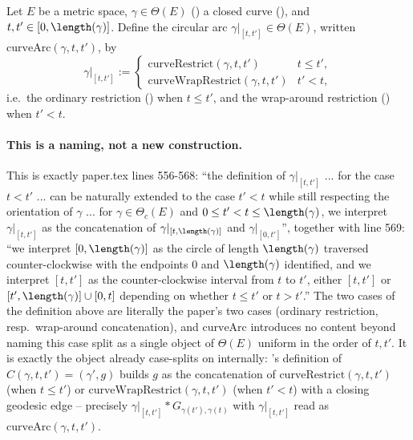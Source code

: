 \begin{definition}
  Let $E$ be a metric space, $\gamma \in \Theta(E)$ () a closed curve
  (), and $t,t' \in [0,\length(\gamma)]$. Define the circular arc
  $\gamma|_{[t,t']} \in \Theta(E)$, written $\mathrm{curveArc}(\gamma,t,t')$, by
  \[
    \gamma|_{[t,t']} :=
    \begin{cases}
      \mathrm{curveRestrict}(\gamma,t,t') & t \le t' , \\
      \mathrm{curveWrapRestrict}(\gamma,t,t') & t' < t ,
    \end{cases}
  \]
  i.e.\ the ordinary restriction () when $t \le t'$, and the wrap-around
  restriction () when $t' < t$.

  \paragraph{This is a naming, not a new construction.} This is exactly paper.tex lines 556-568:
  ``the definition of $\gamma|_{[t,t']}$ ... for the case $t<t'$ ... can be naturally extended to
  the case $t'<t$ while still respecting the orientation of $\gamma$ ... for $\gamma \in
  \Theta_c(E)$ and $0 \le t' < t \le \length(\gamma)$, we interpret $\gamma|_{[t,t']}$ as the
  concatenation of $\gamma|_{[t,\length(\gamma)]}$ and $\gamma|_{[0,t']}$'', together with line 569:
  ``we interpret $[0,\length(\gamma)]$ as the circle of length $\length(\gamma)$ traversed
  counter-clockwise with the endpoints $0$ and $\length(\gamma)$ identified, and we interpret
  $[t,t']$ as the counter-clockwise interval from $t$ to $t'$, either $[t,t']$ or
  $[t',\length(\gamma)]\cup[0,t]$ depending on whether $t\le t'$ or $t>t'$.'' The two cases of the
  definition above are literally the paper's two cases (ordinary restriction, resp.\ wrap-around
  concatenation), and $\mathrm{curveArc}$ introduces no content beyond naming this case split as a
  single object of $\Theta(E)$ uniform in the order of $t,t'$. It is exactly the object
   already case-splits on internally: 's definition of
  $C(\gamma,t,t')=(\gamma',g)$ builds $g$ as the concatenation of
  $\mathrm{curveRestrict}(\gamma,t,t')$ (when $t\le t'$) or $\mathrm{curveWrapRestrict}(\gamma,t,t')$
  (when $t'<t$) with a closing geodesic edge -- precisely $\gamma|_{[t,t']} *
  G_{\gamma(t'),\gamma(t)}$ with $\gamma|_{[t,t']}$ read as $\mathrm{curveArc}(\gamma,t,t')$.


\end{definition}
